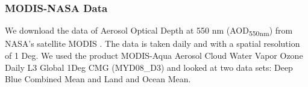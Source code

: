 \subsubsection{MODIS-NASA Data}
We download the data of Aerosol Optical Depth at 550 nm (AOD\textsubscript{550nm}) from NASA’s satellite MODIS \cite{MODIS_AOD}. The data is taken daily and with a spatial resolution of 1 Deg. We used the product MODIS-Aqua Aerosol Cloud Water Vapor Ozone Daily L3 Global 1Deg CMG (MYD08\_D3) and looked at two data sets: Deep Blue Combined Mean and Land and Ocean Mean.